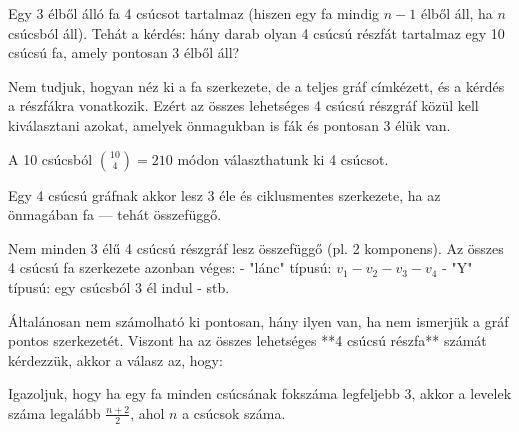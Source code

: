 \begin{solution}
	\noindent Egy 3 élből álló fa 4 csúcsot tartalmaz (hiszen egy fa mindig
	$n-1$ élből áll, ha $n$ csúcsból áll). Tehát a kérdés: hány darab
	olyan 4 csúcsú részfát tartalmaz egy 10 csúcsú fa, amely pontosan
	3 élből áll?
	
	Nem tudjuk, hogyan néz ki a fa szerkezete, de a teljes gráf címkézett,
	és a kérdés a részfákra vonatkozik. Ezért az összes lehetséges 4 csúcsú
	részgráf közül kell kiválasztani azokat, amelyek önmagukban is fák
	és pontosan 3 élük van.
	
	A 10 csúcsból $\binom{10}{4}=210$ módon választhatunk ki 4 csúcsot.
	
	Egy 4 csúcsú gráfnak akkor lesz 3 éle és ciklusmentes szerkezete,
	ha az önmagában fa --- tehát összefüggő.
	
	Nem minden 3 élű 4 csúcsú részgráf lesz összefüggő (pl. 2 komponens).
	Az összes 4 csúcsú fa szerkezete azonban véges: - "lánc" típusú:
	$v_{1}-v_{2}-v_{3}-v_{4}$ - "Y" típusú: egy csúcsból 3 él indul
	- stb.
	
	Általánosan nem számolható ki pontosan, hány ilyen van, ha nem ismerjük
	a gráf pontos szerkezetét. Viszont ha az összes lehetséges {*}{*}4
	csúcsú részfa{*}{*} számát kérdezzük, akkor a válasz az, hogy: 
	\begin{center}
		\par\end{center}
	\begin{center}
		\par\end{center}
\end{solution}
\begin{extraproblem}
	Igazoljuk, hogy ha egy fa minden csúcsának fokszáma legfeljebb 3,
	akkor a levelek száma legalább $\frac{n+2}{2}$, ahol $n$ a csúcsok
	száma. 
\end{extraproblem}

